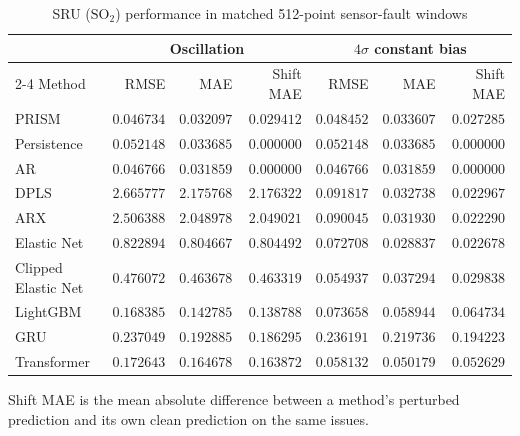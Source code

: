 \begin{table}[!t]
\centering
\caption{SRU ($\mathrm{SO_2}$) performance in matched 512-point sensor-fault windows}
\label{tab:fault-so2}
\small
\begin{tabular}{lrrrrrr}
\hline
 & \multicolumn{3}{c}{Oscillation} & \multicolumn{3}{c}{$4\sigma$ constant bias} \\
\cline{2-4}\cline{5-7}
Method & RMSE & MAE & Shift MAE & RMSE & MAE & Shift MAE \\
\hline
PRISM & \(0.046734\) & \(0.032097\) & \(0.029412\) & \(0.048452\) & \(0.033607\) & \(0.027285\) \\
Persistence & \(0.052148\) & \(0.033685\) & \(0.000000\) & \(0.052148\) & \(0.033685\) & \(0.000000\) \\
AR & \(0.046766\) & \(0.031859\) & \(0.000000\) & \(0.046766\) & \(0.031859\) & \(0.000000\) \\
DPLS & \(2.665777\) & \(2.175768\) & \(2.176322\) & \(0.091817\) & \(0.032738\) & \(0.022967\) \\
ARX & \(2.506388\) & \(2.048978\) & \(2.049021\) & \(0.090045\) & \(0.031930\) & \(0.022290\) \\
Elastic Net & \(0.822894\) & \(0.804667\) & \(0.804492\) & \(0.072708\) & \(0.028837\) & \(0.022678\) \\
Clipped Elastic Net & \(0.476072\) & \(0.463678\) & \(0.463319\) & \(0.054937\) & \(0.037294\) & \(0.029838\) \\
LightGBM & \(0.168385\) & \(0.142785\) & \(0.138788\) & \(0.073658\) & \(0.058944\) & \(0.064734\) \\
GRU & \(0.237049\) & \(0.192885\) & \(0.186295\) & \(0.236191\) & \(0.219736\) & \(0.194223\) \\
Transformer & \(0.172643\) & \(0.164678\) & \(0.163872\) & \(0.058132\) & \(0.050179\) & \(0.052629\) \\
\hline
\end{tabular}
\par\smallskip
\parbox{0.96\textwidth}{\footnotesize Shift MAE is the mean absolute difference between a method's perturbed prediction and its own clean prediction on the same issues.}
\end{table}

